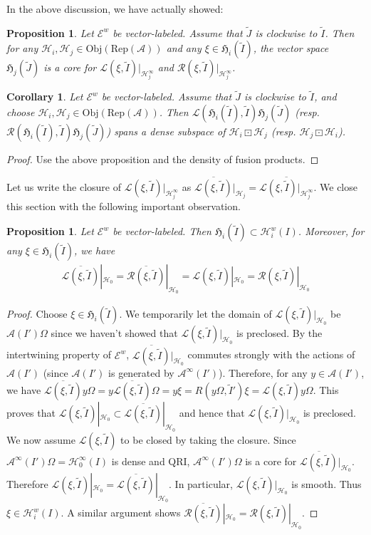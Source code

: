 \documentclass[12pt,a4paper]{article}
\theoremstyle{definition}
\theoremstyle{plain}
\newtheorem{pp}[df]{Proposition}
\newtheorem{co}[df]{Corollary}
\newcommand{\fk}{\mathfrak}
\newcommand{\mc}{\mathcal}
\newcommand{\wtd}{\widetilde}
\newcommand{\ovl}{\overline}
\newcommand{\scr}{\mathscr}
\newcommand{\RepA}{\mathrm{Rep}(\mc A)}
\newcommand{\Obj}{\mathrm{Obj}}
\numberwithin{equation}{subsection}
\begin{document}
In the above discussion, we have actually showed:

\begin{pp}\label{lb23}
Let $\scr E^w$ be vector-labeled. Assume that $\wtd J$ is clockwise to $\wtd I$. Then for any $\mc H_i,\mc H_j\in\Obj(\RepA)$ and any $\xi\in\fk H_i(\wtd I)$, the vector space $\fk H_j(\wtd J)$ is a core for $\mc L(\xi,\wtd I)|_{\mc H_j^\infty}$ and $\mc R(\xi,\wtd I)|_{\mc H_j^\infty}$.
\end{pp}

\begin{co}\label{lb22}
Let $\scr E^w$ be vector-labeled. Assume that $\wtd J$ is clockwise to $\wtd I$, and choose $\mc H_i,\mc H_j\in\Obj(\RepA)$. Then  $\mc L(\fk H_i(\wtd I),\wtd I)\fk H_j(\wtd J)$ (resp. $\mc R(\fk H_i(\wtd I),\wtd I)\fk H_j(\wtd J)$) spans a dense subspace of $\mc H_i\boxdot\mc H_j$ (resp. $\mc H_j\boxdot\mc H_i$).
\end{co}
\begin{proof}
Use the above proposition and the density of fusion products.
\end{proof}

Let us write the closure of $\mc L(\xi,\wtd I)|_{\mc H_j^\infty}$ as $\ovl{\mc L(\xi,\wtd I)}|_{\mc H_j}=\ovl{\mc L(\xi,\wtd I)|_{\mc H_j^\infty}}$.  We close this section with the following important observation.

\begin{pp}\label{lb27}
Let $\scr E^w$ be vector-labeled. Then $\fk H_i(\wtd I)\subset\mc H_i^w(I)$. Moreover, for any $\xi\in\fk H_i(\wtd I)$, we have
\begin{align}
\ovl{\mc L(\xi,\wtd I)}|_{\mc H_0}=\ovl{\mc R(\xi,\wtd I)}|_{\mc H_0}=\scr L(\xi,\wtd I)|_{\mc H_0}=\scr R(\xi,\wtd I)|_{\mc H_0}\label{eq25}
\end{align}
\end{pp}

\begin{proof}
Choose $\xi\in\fk H_i(\wtd I)$. We temporarily let the domain of $\scr L(\xi,\wtd I)|_{\mc H_0}$ be $\mc A(I')\Omega$ since we haven't showed that $\scr L(\xi,\wtd I)|_{\mc H_0}$ is preclosed. By the intertwining property of $\scr E^w$, $\ovl{\mc L(\xi,\wtd I)}|_{\mc H_0}$ commutes strongly with the actions of $\mc A(I')$ (since $\mc A(I')$ is generated by $\mc A^\infty(I')$). Therefore, for any $y\in\mc A(I')$, we have $\ovl{\mc L(\xi,\wtd I)}y\Omega=y\ovl{\mc L(\xi,\wtd I)}\Omega=y\xi=R(y\Omega,\wtd I')\xi=\scr L(\xi,\wtd I)y\Omega$. This proves that $\scr L(\xi,\wtd I)|_{\mc H_0}\subset\ovl{\mc L(\xi,\wtd I)}|_{\mc H_0}$ and hence that $\scr L(\xi,\wtd I)|_{\mc H_0}$ is preclosed. We now assume $\scr L(\xi,\wtd I)$ to be closed by taking the closure. Since $\mc A^\infty(I')\Omega=\mc H_0^\infty(I)$ is dense and QRI, $\mc A^\infty(I')\Omega$ is a core for $\ovl{\mc L(\xi,\wtd I)}|_{\mc H_0}$. Therefore $\scr L(\xi,\wtd I)|_{\mc H_0}=\ovl{\mc L(\xi,\wtd I)}|_{\mc H_0}$. In particular, $\scr L(\xi,\wtd I)|_{\mc H_0}$ is smooth. Thus $\xi\in\mc H_i^w(I)$. A similar argument shows $\ovl{\mc R(\xi,\wtd I)}|_{\mc H_0}=\scr R(\xi,\wtd I)|_{\mc H_0}$.
\end{proof}
\end{document}

